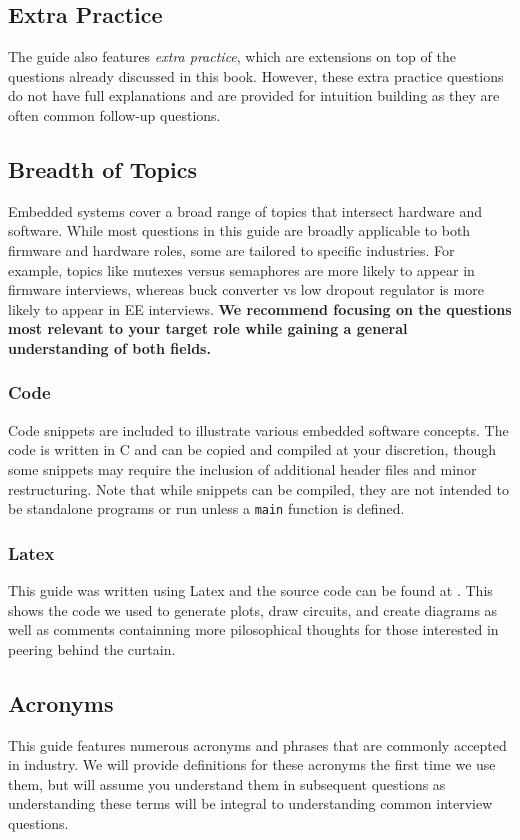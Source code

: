 \documentclass[main.tex]{subfiles}
\begin{document}
\subsection{Extra Practice}
The guide also features \textit{extra practice}, which are extensions on top of the questions already discussed in this book. However, these extra practice questions do not have full explanations and are provided for intuition building as they are often common follow-up questions. 

\subsection {Breadth of Topics}
Embedded systems cover a broad range of topics that intersect hardware and software. While most questions in this guide are broadly applicable to both firmware and hardware roles, some are tailored to specific industries. For example, topics like mutexes versus semaphores are more likely to appear in firmware interviews, whereas buck converter vs low dropout regulator is more likely to appear in EE interviews. \textbf{We recommend focusing on the questions most relevant to your target role while gaining a general understanding of both fields.}

\subsubsection{Code}
Code snippets are included to illustrate various embedded software concepts. The code is written in C and can be copied and compiled at your discretion, though some snippets may require the inclusion of additional header files and minor restructuring. Note that while snippets can be compiled, they are not intended to be standalone programs or run unless a \texttt{main} function is defined.

\subsubsection{Latex}
This guide was written using Latex and the source code can be found at . This shows the code we used to generate plots, draw circuits, and create diagrams as well as comments containning more pilosophical thoughts for those interested in peering behind the curtain.

\subsection{Acronyms}
This guide features numerous acronyms and phrases that are commonly accepted in industry. We will provide definitions for these acronyms the first time we use them, but will assume you understand them in subsequent questions as understanding these terms will be integral to understanding common interview questions. 
\end{document}
